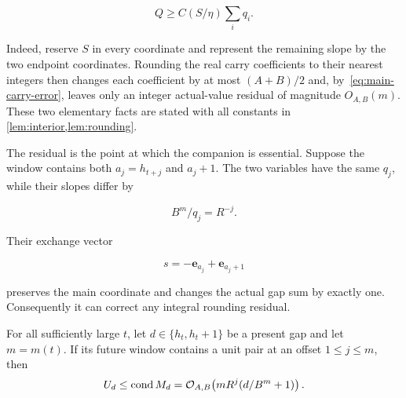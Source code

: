 \begin{equation}
  Q\ge C(S/\eta)\sum_iq_i.
  \label{eq:main-interior}
\end{equation}

Indeed, reserve $S$ in every coordinate and represent the remaining slope by
the two endpoint coordinates.  Rounding the real carry coefficients to their
nearest integers then changes each coefficient by at most $(A+B)/2$ and,
by~\eqref{eq:main-carry-error}, leaves only an integer actual-value residual
of magnitude $O_{A,B}(m)$.  These two elementary facts are stated with all
constants in \cref{lem:interior,lem:rounding}.

The residual is the point at which the companion is essential.  Suppose the
window contains both $a_j=h_{t+j}$ and $a_j+1$.  The two variables have the
same $q_j$, while their slopes differ by

\begin{equation}
  B^m/q_j=R^{-j}.
  \label{eq:main-unit-width}
\end{equation}

Their exchange vector

\[
  s=-\mathbf e_{a_j}+\mathbf e_{a_j+1}
\]

preserves the main coordinate and changes the actual gap sum by exactly one.
Consequently it can correct any integral rounding residual.

\begin{lemma}
  \label{lem:main-conductor}
  For all sufficiently large $t$, let $d\in\{h_t,h_t+1\}$ be a present gap
  and let $m=m(t)$.  If its future window contains a unit pair at an offset
  $1\le j\le m$, then
  \begin{equation}
    U_d\le \operatorname{cond} M_d
    =\mathcal{O}_{A,B}\!\left(
      mR^j(d/B^m+1)
    \right).
    \label{eq:main-conductor}
  \end{equation}
\end{lemma}

